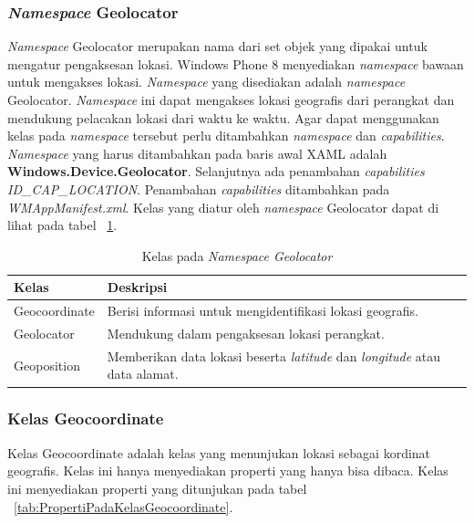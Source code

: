 \subsubsection{\textit{Namespace} Geolocator}
\label{subsubsec:Namespace Geolocator}
\hspace{0.5cm} \textit{Namespace} Geolocator merupakan nama dari set objek yang dipakai untuk mengatur pengaksesan lokasi. Windows Phone 8 menyediakan \textit{namespace} bawaan untuk mengakses lokasi. \textit{Namespace} yang disediakan adalah \textit{namespace} Geolocator. \textit{Namespace} ini dapat mengakses lokasi geografis dari perangkat dan mendukung pelacakan lokasi dari waktu ke waktu. Agar dapat menggunakan kelas pada \textit{namespace} tersebut perlu ditambahkan \textit{namespace} dan \textit{capabilities}. \textit{Namespace} yang harus ditambahkan pada baris awal XAML adalah \textbf{Windows.Device.Geolocator}. Selanjutnya ada penambahan \textit{capabilities ID\_CAP\_LOCATION}. Penambahan \textit{capabilities} ditambahkan pada \textit{WMAppManifest.xml}. Kelas yang diatur oleh \textit{namespace} Geolocator dapat di lihat pada tabel ~\ref{tab:KelasPadaNamespaceGeolocator}\cite{DevWP8}.
\begin{table}[h]
	\centering
		\begin{tabular}{ |p{4cm}|p{10cm}|}
				\hline
				Kelas & Deskripsi \\ \hline
				Geocoordinate & Berisi informasi untuk mengidentifikasi lokasi geografis. \\ \hline
				Geolocator & Mendukung dalam pengaksesan lokasi perangkat. \\ \hline
				Geoposition & Memberikan data lokasi beserta \textit{latitude} dan \textit{longitude} atau data alamat. \\ \hline
				\hline
		\end{tabular}
	\caption{Kelas pada \textit{Namespace Geolocator}}
	\label{tab:KelasPadaNamespaceGeolocator}
\end{table}

\subsubsection{Kelas Geocoordinate}
\label{subsubsec:Kelas Geocoordinate}
\hspace{0.5cm} Kelas Geocoordinate adalah kelas yang menunjukan lokasi sebagai kordinat geografis. Kelas ini hanya menyediakan properti yang hanya bisa dibaca. Kelas ini menyediakan properti yang ditunjukan pada tabel ~\ref{tab:PropertiPadaKelasGeocoordinate}.

